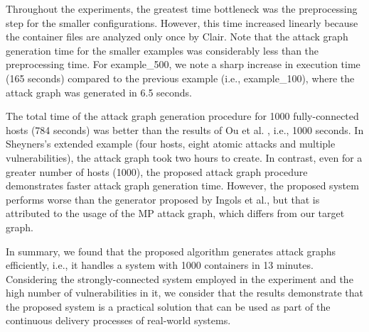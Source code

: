 Throughout the experiments, the greatest time bottleneck was the preprocessing step for the smaller configurations. However, this time increased linearly because the container files are analyzed only once by Clair. Note that the attack graph generation time for the smaller examples was considerably less than the preprocessing time. For example\_500, we note a sharp increase in execution time (165 seconds) compared to the previous example (i.e., example\_100), where the attack graph was generated in 6.5 seconds.

The total time of the attack graph generation procedure for 1000 fully-connected hosts (784 seconds) was better than the results of Ou et al. \cite{ou2006scalable}, i.e., 1000 seconds. In Sheyners's extended example (four hosts, eight atomic attacks and multiple vulnerabilities), the attack graph took two hours to create. In contrast, even for a greater number of hosts (1000), the proposed attack graph procedure demonstrates faster attack graph generation time. However, the proposed system performs worse than the generator proposed by Ingols et al., but that is attributed to the usage of the MP attack graph, which differs from our target graph. 

In summary, we found that the proposed algorithm generates attack graphs efficiently, i.e., it handles a system with 1000 containers in 13 minutes. Considering the strongly-connected system employed in the experiment and the high number of vulnerabilities in it, we consider that the results demonstrate that the proposed system is a practical solution that can be used as part of the continuous delivery processes of real-world systems. 